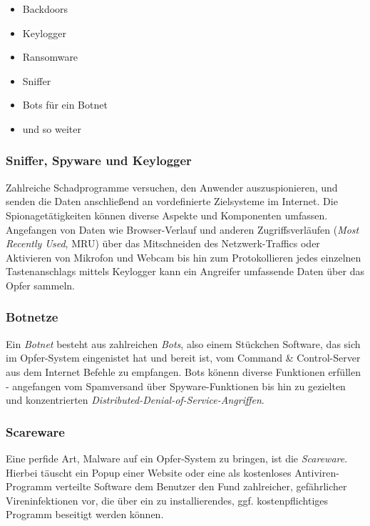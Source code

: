 \begin{multicols}{2}
	\begin{itemize}
		\item Backdoors
		\item Keylogger
		\item Ransomware
		\item Sniffer
		\item Bots für ein Botnet
		\item und so weiter
	\end{itemize}
\end{multicols}

\subsubsection{Sniffer, Spyware und Keylogger}
\label{sec:SnifferSpywareKeylogger}

Zahlreiche Schadprogramme versuchen, den Anwender auszuspionieren, und senden die Daten anschließend an vordefinierte Zielsysteme im Internet. Die Spionagetätigkeiten können diverse Aspekte und Komponenten umfassen. Angefangen von Daten wie Browser-Verlauf und anderen Zugriffsverläufen (\textit{Most Recently Used}, MRU) über das Mitschneiden des Netzwerk-Traffics oder Aktivieren von Mikrofon und Webcam bis hin zum Protokollieren jedes einzelnen Tastenanschlags mittels Keylogger kann ein Angreifer umfassende Daten über das Opfer sammeln.

\subsubsection{Botnetze}
\label{sec:Botnetze}

Ein \textit{Botnet} besteht aus zahlreichen \textit{Bots}, also einem Stückchen Software, das sich im Opfer-System eingenistet hat und bereit ist, vom Command \& Control-Server aus dem Internet Befehle zu empfangen. Bots könenn diverse Funktionen erfüllen - angefangen vom Spamversand über Spyware-Funktionen bis hin zu gezielten und konzentrierten \textit{Distributed-Denial-of-Service-Angriffen}.

\subsubsection{Scareware}
\label{sec:Scareware}

Eine perfide Art, Malware auf ein Opfer-System zu bringen, ist die \textit{Scareware}. Hierbei täuscht ein Popup einer Website oder eine als kostenloses Antiviren-Programm verteilte Software dem Benutzer den Fund zahlreicher, gefährlicher Vireninfektionen vor, die über ein zu installierendes, ggf. kostenpflichtiges Programm beseitigt werden können.


